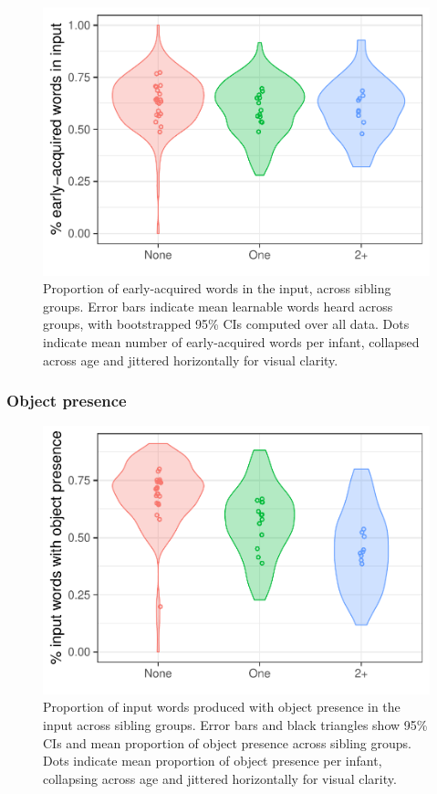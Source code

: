 \documentclass[
  english,
  man,floatsintext]{apa6}
\begin{document}
\begin{figure}
\centering
\includegraphics{SiblingsStudyText_files/figure-latex/Figure-in-cdi-1.pdf}
\caption{\label{fig:Figure-in-cdi}Proportion of early-acquired words in the input, across sibling groups. Error bars indicate mean learnable words heard across groups, with bootstrapped 95\% CIs computed over all data. Dots indicate mean number of early-acquired words per infant, collapsed across age and jittered horizontally for visual clarity.}
\end{figure}

\hypertarget{object-presence}{%
\subsubsection{Object presence}\label{object-presence}}

\begin{figure}
\centering
\includegraphics{SiblingsStudyText_files/figure-latex/Figure-object-presence-1.pdf}
\caption{\label{fig:Figure-object-presence}Proportion of input words produced with object presence in the input across sibling groups. Error bars and black triangles show 95\% CIs and mean proportion of object presence across sibling groups. Dots indicate mean proportion of object presence per infant, collapsing across age and jittered horizontally for visual clarity.}
\end{figure}
\end{document}
